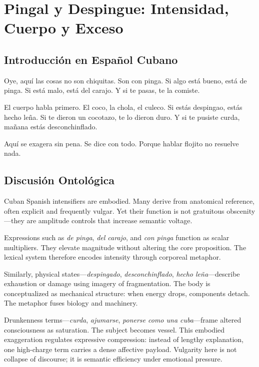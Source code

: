 \documentclass[12pt]{article}
\begin{document}
\section{Pingal y Despingue: Intensidad, Cuerpo y Exceso}

\subsection*{Introducción en Español Cubano}

Oye, aquí las cosas no son chiquitas. Son con pinga. Si algo está bueno, está de pinga. Si está malo, está del carajo. Y si te pasas, te la comiste.

El cuerpo habla primero. El coco, la chola, el culeco. Si estás despingao, estás hecho leña. Si te dieron un cocotazo, te lo dieron duro. Y si te pusiste curda, mañana estás desconchinflado.

Aquí se exagera sin pena. Se dice con todo. Porque hablar flojito no resuelve nada.

\subsection*{Discusión Ontológica}

Cuban Spanish intensifiers are embodied. Many derive from anatomical reference, often explicit and frequently vulgar. Yet their function is not gratuitous obscenity---they are amplitude controls that increase semantic voltage.

Expressions such as \textit{de pinga}, \textit{del carajo}, and \textit{con pinga} function as scalar multipliers. They elevate magnitude without altering the core proposition. The lexical system therefore encodes intensity through corporeal metaphor.

Similarly, physical states---\textit{despingado}, \textit{desconchinflado}, \textit{hecho leña}---describe exhaustion or damage using imagery of fragmentation. The body is conceptualized as mechanical structure: when energy drops, components detach. The metaphor fuses biology and machinery.

Drunkenness terms---\textit{curda}, \textit{ajumarse}, \textit{ponerse como una cuba}---frame altered consciousness as saturation. The subject becomes vessel. This embodied exaggeration regulates expressive compression: instead of lengthy explanation, one high-charge term carries a dense affective payload. Vulgarity here is not collapse of discourse; it is semantic efficiency under emotional pressure.
\end{document}
